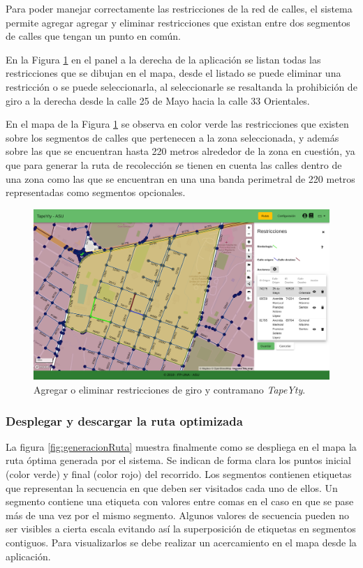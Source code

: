 Para poder manejar correctamente las restricciones de la red de calles, el sistema permite agregar agregar y eliminar restricciones que existan entre dos segmentos de calles que tengan un punto en común. 

En la Figura \ref{fig:restriccion} en el panel a la derecha de la aplicación se listan todas las restricciones que se dibujan en el mapa, desde el listado se puede eliminar una restricción o se puede seleccionarla, al seleccionarle se resaltanda la prohibición de giro a la derecha desde la calle 25 de Mayo hacia la calle 33 Orientales.

En el mapa de la Figura \ref{fig:restriccion} se observa en color verde las restricciones que existen sobre los segmentos de calles que pertenecen a la zona seleccionada, y además sobre las que se encuentran hasta 220 metros alrededor de la zona en cuestión, ya que para generar la ruta de recolección se tienen en cuenta las calles dentro de una zona como las que se encuentran en una una banda perimetral de 220 metros representadas como segmentos opcionales.

\begin{figure}[H]
\centerline{\includegraphics[width=\textwidth]{restricciones.png}}
\caption{Agregar o eliminar restricciones de giro y contramano \textit{TapeYty}.}
\label{fig:restriccion}
\end{figure}

\subsubsection{Desplegar y descargar la ruta optimizada}

La figura \ref{fig:generacionRuta} muestra finalmente como se despliega en el mapa la ruta óptima generada por el sistema. Se indican de forma clara los puntos inicial (color verde) y final (color rojo) del recorrido. Los segmentos contienen etiquetas que representan la secuencia en que deben ser visitados cada uno de ellos. Un segmento contiene una etiqueta con valores entre comas en el caso en que se pase más de una vez por el mismo segmento. Algunos valores de secuencia pueden no ser visibles a cierta escala evitando así la superposición de etiquetas en segmentos contiguos. Para visualizarlos se debe realizar un acercamiento en el mapa desde la aplicación.

